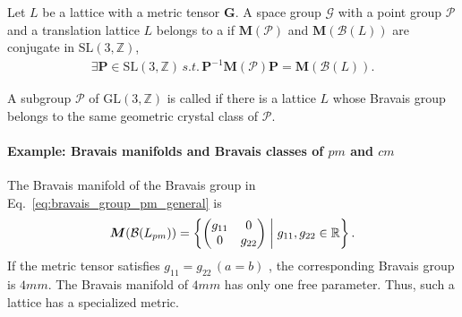 
\begin{screen}
  \begin{defn}
    Let $L$ be a lattice with a metric tensor $\bm{G}$.
    A space group $\mathcal{G}$ with a point group $\mathcal{P}$ and a translation lattice $L$ belongs to a  if $\bm{M}(\mathcal{P})$ and $\bm{M}(\mathcal{B}(L))$ are conjugate in $\mathrm{SL}(3, \mathbb{Z})$,
    \begin{align}
      \exists \bm{P} \in \mathrm{SL}(3, \mathbb{Z}) \,s.t.\, \bm{P}^{-1} \bm{M}(\mathcal{P}) \bm{P} = \bm{M}(\mathcal{B}(L)).
    \end{align}
  \end{defn}
\end{screen}


\begin{screen}
  \begin{defn}[holohedry]
    A subgroup $\mathcal{P}$ of $\mathrm{GL}(3, \mathbb{Z})$ is called  if there is a lattice $L$ whose Bravais group belongs to the same geometric crystal class of $\mathcal{P}$.
  \end{defn}
\end{screen}


\paragraph{Example: Bravais manifolds and Bravais classes of $pm$ and $cm$}

The Bravais manifold of the Bravais group in Eq.~\eqref{eq:bravais_group_pm_general} is
\begin{align*}
  \bm{M}(\mathcal{B}(L_{pm})) = \left\{ 
    \begin{pmatrix} g_{11} & 0 \\ 0 & g_{22} \end{pmatrix}
   \mathrel{}\middle|\mathrel{} 
    g_{11}, g_{22} \in \mathbb{R}
   \right\}.
\end{align*}
If the metric tensor satisfies $g_{11} = g_{22} \, (a = b)$ , the corresponding Bravais group is $4mm$.
The Bravais manifold of $4mm$ has only one free parameter.
Thus, such a lattice has a specialized metric.

